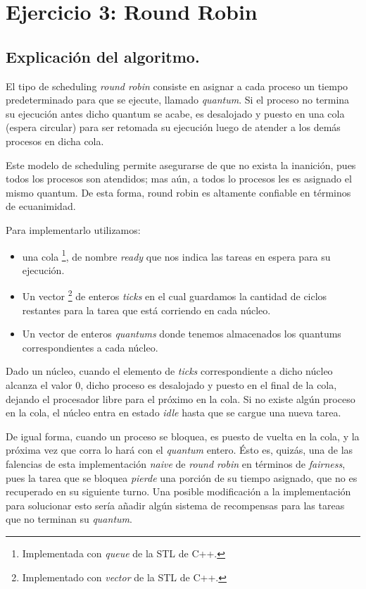 \documentclass[a4paper]{article}
\begin{document}
\newpage

\section{Ejercicio 3: Round Robin}

\subsection{Explicación del algoritmo.}
El tipo de scheduling \textit{round robin} consiste en asignar a cada
proceso un tiempo predeterminado para que se ejecute, llamado
\textit{quantum}. Si el proceso no termina su ejecución antes dicho quantum
se acabe, es desalojado y puesto en una cola (espera circular) para ser
retomada su ejecución luego de atender a los demás procesos en dicha cola.

Este modelo de scheduling permite asegurarse de que no exista la inanición,
pues todos los procesos son atendidos; mas aún, a todos lo
procesos les es asignado el mismo quantum. De esta
forma, round robin es altamente confiable en términos de ecuanimidad.

Para implementarlo utilizamos:
\begin{itemize}
\item una cola \footnote{Implementada con \textit{queue} de la STL de C++.}, de nombre
\textit{ready} que nos indica las tareas en espera para su ejecución.
\item Un vector \footnote{Implementado con
\textit{vector} de la STL de C++.} de enteros \textit{ticks} en el cual
guardamos la cantidad de ciclos restantes para la tarea que está corriendo
en cada núcleo.
\item Un vector de enteros \textit{quantums} donde tenemos
almacenados los quantums correspondientes a cada núcleo. 
\end{itemize}

Dado un núcleo, cuando el elemento de \textit{ticks} correspondiente a dicho
núcleo alcanza el valor $0$, dicho proceso es desalojado y puesto en el
final de la cola, dejando el procesador libre para el próximo en la cola.
Si no existe algún proceso en la cola, el núcleo entra en estado
\textit{idle} hasta que se cargue una nueva tarea.

De igual forma, cuando un proceso se bloquea, es puesto de vuelta en la
cola, y la próxima vez que corra lo hará con el \textit{quantum} entero.
Ésto es, quizás, una de las falencias de esta implementación \textit{naive}
de \textit{round robin} en términos de \textit{fairness}, pues la tarea que
se bloquea \textit{pierde} una porción de su tiempo asignado, que no es
recuperado en su siguiente turno. Una posible modificación a la
implementación para solucionar esto sería añadir algún sistema de
recompensas para las tareas que no terminan su \textit{quantum}.
\end{document}
